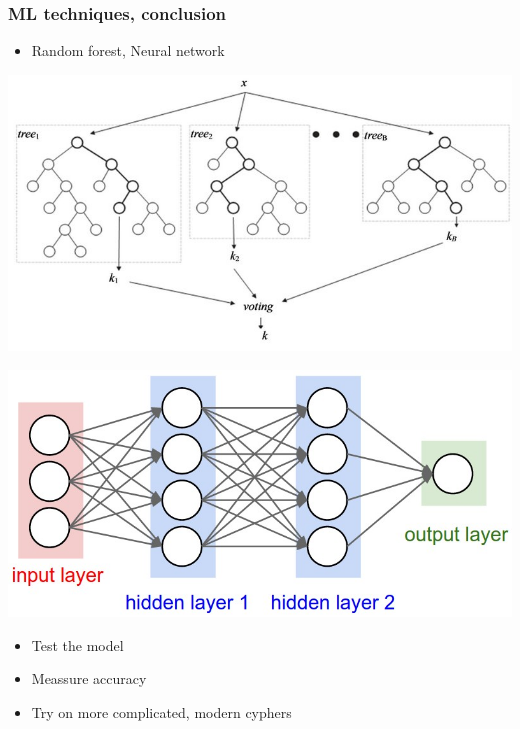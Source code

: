 \documentclass{beamer}
\begin{document}
\begin{frame}
\frametitle{ML techniques, conclusion}

\pause
\begin{itemize}
	\item Random forest, Neural network
\end{itemize}

\begin{minipage}{.5\textwidth}
  \centering
  \includegraphics[width=0.8\linewidth]{random_forest.jpg}
  \label{fig:test1}
\end{minipage}%
\begin{minipage}{.5\textwidth}
  \centering
  \includegraphics[width=1\linewidth]{neural_net2.jpeg}
  \label{fig:test2}
\end{minipage}

\begin{itemize}
	\pause
	\item Test the model
	\pause
	\item Meassure accuracy
	\pause
	\item Try on more complicated, modern cyphers
\end{itemize}

\end{frame}
\end{document}
